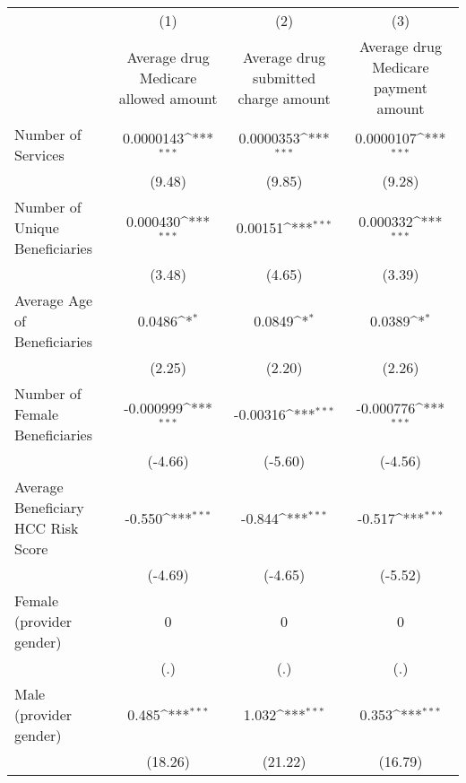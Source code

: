 \def\sym#1{\ifmmode^{#1}\else\(^{#1}\)\fi}
\begin{adjustbox}{max
width={\textwidth},caption={Average Cost per Drug Service over Time, by Provider\label{table:aggregatedrug1}},nofloat=table}
\begin{tabular}{l*{3}{c}}
\toprule
                    &\multicolumn{1}{c}{(1)}&\multicolumn{1}{c}{(2)}&\multicolumn{1}{c}{(3)}\\
                    &\multicolumn{1}{c}{Average drug Medicare allowed amount}&\multicolumn{1}{c}{Average drug submitted charge amount}&\multicolumn{1}{c}{Average drug Medicare payment amount}\\
\midrule
Number of Services  &   0.0000143\sym{***}&   0.0000353\sym{***}&   0.0000107\sym{***}\\
                    &      (9.48)         &      (9.85)         &      (9.28)         \\
\addlinespace
Number of Unique Beneficiaries&    0.000430\sym{***}&     0.00151\sym{***}&    0.000332\sym{***}\\
                    &      (3.48)         &      (4.65)         &      (3.39)         \\
\addlinespace
Average Age of Beneficiaries&      0.0486\sym{*}  &      0.0849\sym{*}  &      0.0389\sym{*}  \\
                    &      (2.25)         &      (2.20)         &      (2.26)         \\
\addlinespace
Number of Female Beneficiaries&   -0.000999\sym{***}&    -0.00316\sym{***}&   -0.000776\sym{***}\\
                    &     (-4.66)         &     (-5.60)         &     (-4.56)         \\
\addlinespace
Average Beneficiary HCC Risk Score&      -0.550\sym{***}&      -0.844\sym{***}&      -0.517\sym{***}\\
                    &     (-4.69)         &     (-4.65)         &     (-5.52)         \\
\addlinespace
Female (provider gender)&           0         &           0         &           0         \\
                    &         (.)         &         (.)         &         (.)         \\
\addlinespace
Male (provider gender)&       0.485\sym{***}&       1.032\sym{***}&       0.353\sym{***}\\
                    &     (18.26)         &     (21.22)         &     (16.79)         \\

\end{tabular}
\end{adjustbox}
